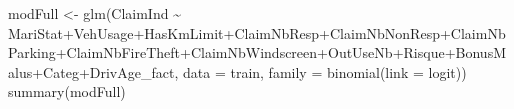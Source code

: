 \documentclass[
]{article}
\newenvironment{Shaded}{\begin{snugshade}}{\end{snugshade}}
\newcommand{\AttributeTok}[1]{\textcolor[rgb]{0.77,0.63,0.00}{#1}}
\newcommand{\FunctionTok}[1]{\textcolor[rgb]{0.00,0.00,0.00}{#1}}
\newcommand{\NormalTok}[1]{#1}
\newcommand{\OtherTok}[1]{\textcolor[rgb]{0.56,0.35,0.01}{#1}}
\newcommand{\SpecialCharTok}[1]{\textcolor[rgb]{0.00,0.00,0.00}{#1}}
\begin{document}
\begin{Shaded}
\begin{Highlighting}[]
\NormalTok{modFull }\OtherTok{\textless{}{-}} \FunctionTok{glm}\NormalTok{(ClaimInd }\SpecialCharTok{\textasciitilde{}}\NormalTok{ MariStat}\SpecialCharTok{+}\NormalTok{VehUsage}\SpecialCharTok{+}\NormalTok{HasKmLimit}\SpecialCharTok{+}\NormalTok{ClaimNbResp}\SpecialCharTok{+}\NormalTok{ClaimNbNonResp}\SpecialCharTok{+}\NormalTok{ClaimNbParking}\SpecialCharTok{+}\NormalTok{ClaimNbFireTheft}\SpecialCharTok{+}\NormalTok{ClaimNbWindscreen}\SpecialCharTok{+}\NormalTok{OutUseNb}\SpecialCharTok{+}\NormalTok{Risque}\SpecialCharTok{+}\NormalTok{BonusMalus}\SpecialCharTok{+}\NormalTok{Categ}\SpecialCharTok{+}\NormalTok{DrivAge\_fact, }\AttributeTok{data =}\NormalTok{ train, }\AttributeTok{family =} \FunctionTok{binomial}\NormalTok{(}\AttributeTok{link =}\NormalTok{ logit))}
\FunctionTok{summary}\NormalTok{(modFull)}
\end{Highlighting}
\end{Shaded}
\end{document}
